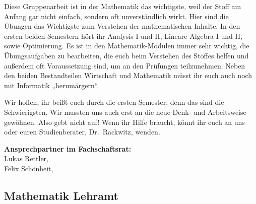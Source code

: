 Diese Gruppenarbeit ist in der Mathematik das wichtigste, weil der Stoff am Anfang gar nicht einfach, sondern oft unverständlich wirkt.
Hier sind die Übungen das Wichtigste zum Verstehen der mathematischen Inhalte.
In den ersten beiden Semestern hört ihr Analysis I und II, Lineare Algebra I und II, sowie Optimierung.
Es ist in den Mathematik-Modulen immer sehr wichtig, die Übungsaufgaben zu bearbeiten, die euch beim Verstehen des Stoffes helfen und außerdem oft Voraussetzung sind, um an den Prüfungen teilzunehmen.
Neben den beiden Bestandteilen Wirtschaft und Mathematik müsst ihr euch auch noch mit Informatik „herumärgern“.

Wir hoffen, ihr beißt euch durch die ersten Semester, denn das sind die Schwierigsten.
Wir mussten uns auch erst an die neue Denk- und Arbeitsweise gewöhnen.
Also gebt nicht auf!
Wenn ihr Hilfe braucht, könnt ihr euch an uns oder euren Studienberater, Dr.~Rackwitz, wenden.

\textbf{Ansprechpartner im Fachschaftsrat:}\\
Lukas Rettler, \\
Felix Schönheit, \\

\newpage


\subsection{Mathematik Lehramt}
\label{studiengang_lehramt}

\label{studiengang_lag}

